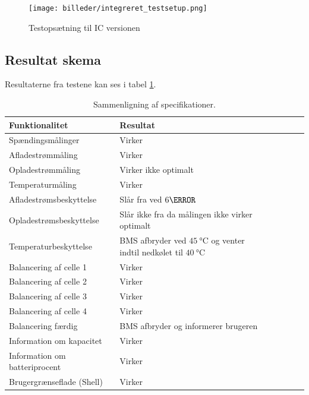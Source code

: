 \begin{figure}[h]
	\centering
	\texttt{[image: billeder/integreret\_testsetup.png]}
	\caption{Testopsætning til IC versionen}
	\label{fig:ic_testsetup}
\end{figure}

\subsection{Resultat skema}
Resultaterne fra testene kan ses i tabel \ref{tab:resultat_IC}.

\begin{table}[h!]
	\small
	\centering
	\begin{threeparttable}
		\begin{tabular}{ l l l l l l l }
			\toprule
			\multicolumn{1}{l}{\textbf{Funktionalitet}}          &
			\multicolumn{1}{l}{\textbf{Resultat}}           \\
			\hline
			Spændingsmålinger              & Virker                         \\
			Afladestrømmåling                    		& Virker                         \\
			Opladestrømmåling                    		& Virker ikke optimalt                         \\
			Temperaturmåling                    		& Virker                       \\
			Afladestrømsbeskyttelse		& Slår fra ved $6\ampere$        \\
			Opladestrømsbeskyttelse   	& Slår ikke fra da målingen ikke virker optimalt      \\
			Temperaturbeskyttelse          & BMS afbryder ved $\SI{45}{\celsius}$ og venter indtil nedkølet til $\SI{40}{\celsius}$           \\
			Balancering af celle 1         & Virker                         \\
			Balancering af celle 2        & Virker                         \\
			Balancering af celle 3        & Virker                         \\			
			Balancering af celle 4        & Virker                         \\
			Balancering færdig             & BMS afbryder og informerer brugeren                  \\
			Information om kapacitet       & Virker                          \\
			Information om batteriprocent 							& Virker			 \\
			Brugergrænseflade (Shell)                       & Virker                    \\
			
			\bottomrule
		\end{tabular}
		\caption{Sammenligning af specifikationer.}
		\label{tab:resultat_IC}
	\end{threeparttable}
\end{table} 
\FloatBlock

